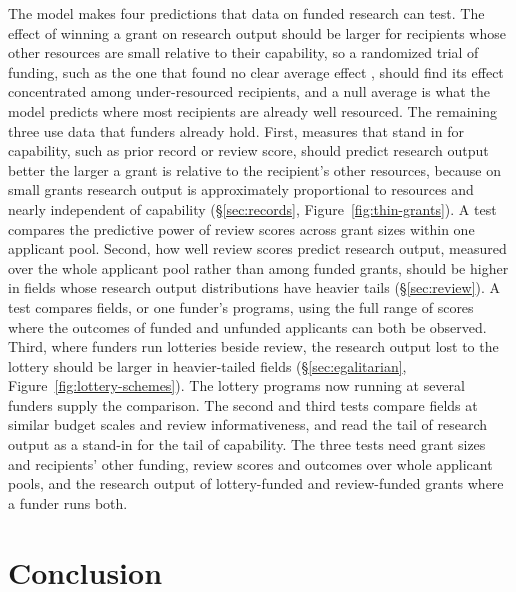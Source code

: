 \documentclass[article, 11pt, reqno]{amsart}
\theoremstyle{named}
\begin{document}
The model makes four predictions that data on funded research can test. The effect of winning a grant on research output should be larger for recipients whose other resources are small relative to their capability, so a randomized trial of funding, such as the one that found no clear average effect \citep{Barnett2024}, should find its effect concentrated among under-resourced recipients, and a null average is what the model predicts where most recipients are already well resourced. The remaining three use data that funders already hold. First, measures that stand in for capability, such as prior record or review score, should predict research output better the larger a grant is relative to the recipient's other resources, because on small grants research output is approximately proportional to resources and nearly independent of capability (\S\ref{sec:records}, Figure~\ref{fig:thin-grants}). A test compares the predictive power of review scores across grant sizes within one applicant pool. Second, how well review scores predict research output, measured over the whole applicant pool rather than among funded grants, should be higher in fields whose research output distributions have heavier tails (\S\ref{sec:review}). A test compares fields, or one funder's programs, using the full range of scores where the outcomes of funded and unfunded applicants can both be observed. Third, where funders run lotteries beside review, the research output lost to the lottery should be larger in heavier-tailed fields (\S\ref{sec:egalitarian}, Figure~\ref{fig:lottery-schemes}). The lottery programs now running at several funders supply the comparison. The second and third tests compare fields at similar budget scales and review informativeness, and read the tail of research output as a stand-in for the tail of capability. The three tests need grant sizes and recipients' other funding, review scores and outcomes over whole applicant pools, and the research output of lottery-funded and review-funded grants where a funder runs both.

\section{Conclusion}\label{sec:conclusion}
\end{document}
